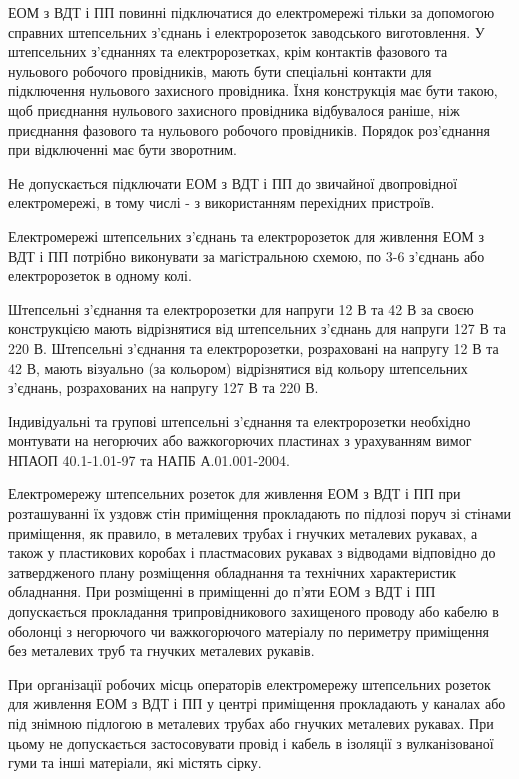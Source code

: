 ЕОМ з ВДТ і ПП повинні підключатися до електромережі тільки за допомогою справних штепсельних з'єднань і електророзеток заводського виготовлення.
У штепсельних з'єднаннях та електророзетках, крім контактів фазового та нульового робочого провідників, мають бути спеціальні контакти для підключення нульового захисного провідника. Їхня конструкція має бути такою, щоб приєднання нульового захисного провідника відбувалося раніше, ніж приєднання фазового та нульового робочого провідників. Порядок роз'єднання при відключенні має бути зворотним.

Не допускається підключати ЕОМ з ВДТ і ПП до звичайної двопровідної електромережі, в тому числі - з використанням перехідних пристроїв.

Електромережі штепсельних з'єднань та електророзеток для живлення ЕОМ з ВДТ і ПП потрібно виконувати за магістральною схемою, по 3-6 з'єднань або електророзеток в одному колі.

Штепсельні з'єднання та електророзетки для напруги 12 В та 42 В за своєю конструкцією мають відрізнятися від штепсельних з'єднань для напруги 127 В та 220 В.
Штепсельні з'єднання та електророзетки, розраховані на напругу 12 В та 42 В, мають візуально (за кольором) відрізнятися від кольору штепсельних з'єднань, розрахованих на напругу 127 В та 220 В.

Індивідуальні та групові штепсельні з'єднання та електророзетки необхідно монтувати на негорючих або важкогорючих пластинах з урахуванням вимог НПАОП 40.1-1.01-97 та НАПБ А.01.001-2004.

Електромережу штепсельних розеток для живлення ЕОМ з ВДТ і ПП при розташуванні їх уздовж стін приміщення прокладають по підлозі поруч зі стінами приміщення, як правило, в металевих трубах і гнучких металевих рукавах, а також у пластикових коробах і пластмасових рукавах з відводами відповідно до затвердженого плану розміщення обладнання та технічних характеристик обладнання.
При розміщенні в приміщенні до п'яти ЕОМ з ВДТ і ПП допускається прокладання трипровідникового захищеного проводу або кабелю в оболонці з негорючого чи важкогорючого матеріалу по периметру приміщення без металевих труб та гнучких металевих рукавів.

При організації робочих місць операторів електромережу штепсельних розеток для живлення ЕОМ з ВДТ і ПП у центрі приміщення прокладають у каналах або під знімною підлогою в металевих трубах або гнучких металевих рукавах. При цьому не допускається застосовувати провід і кабель в ізоляції з вулканізованої гуми та інші матеріали, які містять сірку.

